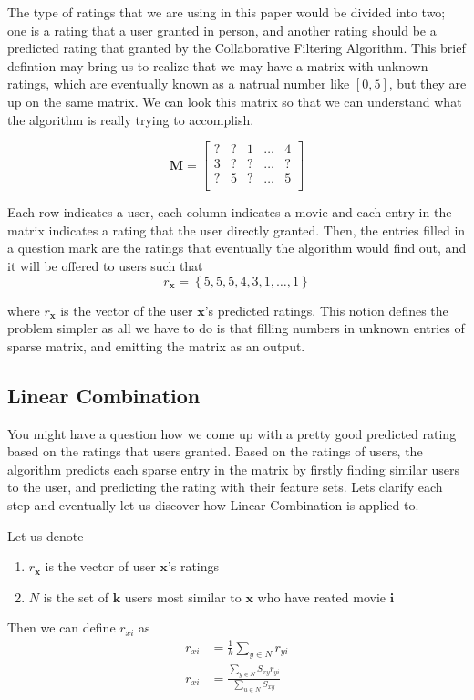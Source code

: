 \documentclass[paper=a4, fontsize=12pt]{scrartcl} %
\numberwithin{equation}{section} %
\numberwithin{figure}{section} %
\numberwithin{table}{section} %
\newcommand{\matxxx}[3] {
\begin{bmatrix}
  #1 \\
  #2 \\
  #3 \\
\end{bmatrix}
}
\begin{document}
  The type of ratings that we are using in this paper would be divided into two;
  one is a rating that a user granted in person, and another rating should be a
  predicted rating that granted by the Collaborative Filtering Algorithm. This
  brief defintion may bring us to realize that we may have a matrix with unknown
  ratings, which are eventually known as a natrual number like \([0,5]\), but
  they are up on the same matrix. We can look this matrix so that we can
  understand what the algorithm is really trying to accomplish.

	\[
		\mathbf{M} =
		\matxxx
		{? & ? & 1 & \dots & 4}
		{3 & ? & ? & \dots & ?}
		{? & 5 & ? & \dots & 5}
	\]

  Each row indicates a user, each column indicates a movie and each entry in the
  matrix indicates a rating that the user directly granted. Then, the entries
  filled in a question mark are the ratings that eventually the algorithm would
  find out, and it will be offered to users such that
  \[
    r_{\mathbf{x}} = \left\{5,5,5,4,3,1,\dots,1\right\}
  \]

  where \(r_\mathbf{x}\) is the vector of the user \(\mathbf{x}\)'s predicted ratings. This
  notion defines the problem simpler as all we have to do is that filling
  numbers in unknown entries of sparse matrix, and emitting the matrix as an
  output.

  \subsection{Linear Combination}

  You might have a question how we come up with a pretty good predicted rating
  based on the ratings that users granted. Based on the ratings of users, the
  algorithm predicts each sparse entry in the matrix by firstly finding similar
  users to the user, and predicting the rating with their feature sets. Lets
  clarify each step and eventually let us discover how Linear Combination is
  applied to.

  Let us denote
  \begin{enumerate}
  \item \(r_{\mathbf{x}}\) is the vector of user \(\mathbf{x}\)'s ratings
  \item \(N\) is the set of \(\mathbf{k}\) users most similar to \(\mathbf{x}\)
    who have reated movie \(\mathbf{i}\)
  \end{enumerate}

  Then we can define \(r_{xi}\) as
  \[
    \begin{split}
      r_{xi} & = \frac{1}{k} \sum_{y \in N} r_{yi} \\
      r_{xi} & = \frac{\sum_{y \in N} S_{xy} r_{yi}}{\sum_{u \in N} S_{xy}}
    \end{split}
  \]
\end{document}
